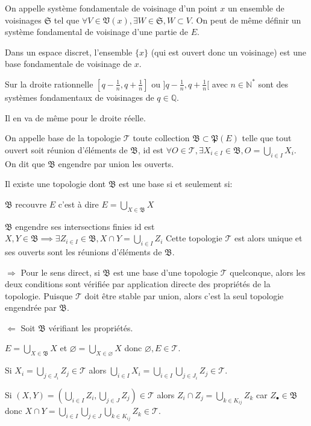 \documentclass[a4paper, 11pt, french]{book}
\newenvironment{itemise}{\itemize}{\enditemize}
\theoremstyle{plain} %
\theoremstyle{definition} %
\theoremstyle{remark} %
\newcommand{\1}{\mathds{1}}
\newcommand\vide{\varnothing}
\newcommand{\N}{\mathbb{N}}
\newcommand{\Q}{\mathbb{Q}}
\begin{document}
On appelle système fondamentale de voisinage d'un point $x$ un ensemble de voisinages $\mathfrak{S}$ tel que $\forall V\in\mathfrak{V}(x), \exists W\in\mathfrak{S}, W\subset V$.
On peut de même définir un système fondamental de voisinage d'une partie de $E$.

\exemple
\begin{itemise}
	\item Dans un espace discret, l'ensemble $\{x\}$ (qui est ouvert donc un voisinage) est une base fondamentale de voisinage de $x$.
	\item Sur la droite rationnelle $[q-\frac{1}{n}, q+\frac{1}{n}]$ ou $]q-\frac{1}{n}, q+\frac{1}{n}[$ avec $n\in\N^*$ sont des systèmes fondamentaux de voisinages de $q\in\Q$.
	\item Il en va de même pour le droite réelle.
\end{itemise}

On appelle base de la topologie $\mathscr{T}$ toute collection $\mathfrak{B}\subset\mathfrak{P}(E)$ telle que tout ouvert soit réunion d'éléments de $\mathfrak{B}$, id est $\forall O\in\mathscr{T}, \exists X_{i\in I}\in\mathfrak{B}, O=\bigcup_{i\in I} X_i$.
On dit que $\mathfrak{B}$ engendre par union les ouverts.

\proposition
Il existe une topologie dont $\mathfrak{B}$ est une base si et seulement si:
\begin{itemise}
	\item $\mathfrak{B}$ recouvre $E$ c'est à dire $E=\bigcup_{X\in\mathfrak{B}}X$
	\item $\mathfrak{B}$ engendre ses intersections finies id est $X, Y\in\mathfrak{B}\implies\exists Z_{i\in I}\in\mathfrak{B}, X\cap Y=\bigcup_{i\in I}Z_i$
\end{itemise}
Cette topologie $\mathscr{T}$ est alors unique et ses ouverts sont les réunions d'éléments de $\mathfrak{B}$.

\demonstration
\begin{itemise}
	\item[$\Rightarrow$] Pour le sens direct, si $\mathfrak{B}$ est une base d'une topologie $\mathscr{T}$ quelconque, alors les deux conditions sont vérifiée par application directe des propriétés de la topologie.
	Puisque $\mathscr{T}$ doit être stable par union, alors c'est la seul topologie engendrée par $\mathfrak{B}$.
	\item[$\Leftarrow$] Soit $\mathfrak{B}$ vérifiant les propriétés.
	\begin{itemise}
		\item $E=\bigcup_{X\in\mathfrak{B}}X$ et $\vide=\bigcup_{X\in\vide}X$ donc $\vide, E\in\mathscr{T}$.
		\item Si $X_i=\bigcup_{j\in J_i}Z_j\in\mathscr{T}$ alors $\bigcup_{i\in I}X_i=\bigcup_{i\in I}\bigcup_{j\in J_i}Z_j\in\mathscr{T}$.
		\item Si $(X, Y)=(\bigcup_{i\in I}Z_i, \bigcup_{j\in J}Z_j)\in\mathscr{T}$ alors $Z_i\cap Z_j=\bigcup_{k\in K_{ij}}Z_k$ car $Z_\bullet\in\mathfrak{B}$ donc $X\cap Y=\bigcup_{i\in I}\bigcup_{j\in J}\bigcup_{k\in K_{ij}}Z_k\in\mathscr{T}$.
	\end{itemise}
\end{itemise}
\end{document}
